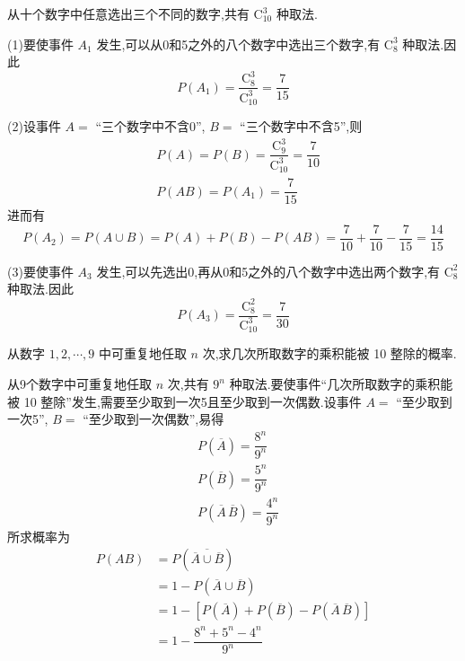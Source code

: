 \begin{solution}
    从十个数字中任意选出三个不同的数字,共有 $\mathrm{C}_{10}^3$ 种取法.

    (1)要使事件 $A_1$ 发生,可以从0和5之外的八个数字中选出三个数字,有 $\mathrm{C}_8^3$ 种取法.因此
    $$
    P(A_1) = \dfrac{\mathrm{C}_8^3}{\mathrm{C}_{10}^3} = \dfrac{7}{15}
    $$

    (2)设事件 $A=$ ``三个数字中不含0'', $B=$ ``三个数字中不含5'',则
    $$
    \begin{aligned}
        & P(A) = P(B) = \dfrac{\mathrm{C}_9^3}{\mathrm{C}_{10}^3} = \dfrac{7}{10} \\
        & P(AB) = P(A_1) = \dfrac{7}{15}
    \end{aligned}
    $$
    进而有
    $$
    P(A_2) = P(A \cup B) = P(A) + P(B) - P(AB) = \dfrac{7}{10} + \dfrac{7}{10} - \dfrac{7}{15} = \dfrac{14}{15}
    $$

    (3)要使事件 $A_3$ 发生,可以先选出0,再从0和5之外的八个数字中选出两个数字,有 $\mathrm{C}_8^2$ 种取法.因此
    $$
    P(A_3) = \dfrac{\mathrm{C}_8^2}{\mathrm{C}_{10}^3} = \dfrac{7}{30}
    $$
\end{solution}

\question 从数字 $1, 2, \cdots, 9$ 中可重复地任取 $n$ 次,求几次所取数字的乘积能被 10 整除的概率.

\begin{solution}
    从9个数字中可重复地任取 $n$ 次,共有 $9^n$ 种取法.要使事件``几次所取数字的乘积能被 10 整除''发生,需要至少取到一次5且至少取到一次偶数.设事件 $A=$ ``至少取到一次5'', $B=$ ``至少取到一次偶数'',易得
    $$
    \begin{aligned}
        & P(\overline{A}) = \dfrac{8^n}{9^n} \\
        & P(\overline{B}) = \dfrac{5^n}{9^n} \\
        & P(\overline{A} \, \overline{B}) = \dfrac{4^n}{9^n}
    \end{aligned}
    $$
    所求概率为
    $$
    \begin{aligned}
        P(AB) &= P(\overline{\overline{A} \cup \overline{B}}) \\
        &= 1 - P(\overline{A} \cup \overline{B}) \\
        &= 1 - [P(\overline{A}) + P(\overline{B}) - P(\overline{A} \, \overline{B})] \\
        &= 1 - \dfrac{8^n + 5^n - 4^n}{9^n}
    \end{aligned}
    $$
\end{solution}

